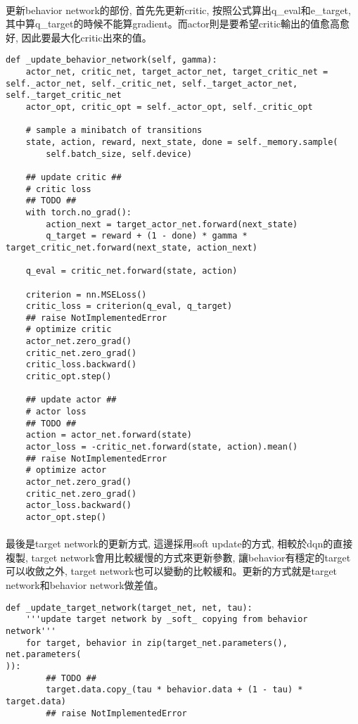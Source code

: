 \paragraph{}
更新behavior network的部份, 首先先更新critic, 按照公式算出q\_eval和e\_target, 其中算q\_target的時候不能算gradient。而actor則是要希望critic輸出的值愈高愈好, 因此要最大化critic出來的值。
\begin{lstlisting}
def _update_behavior_network(self, gamma):
    actor_net, critic_net, target_actor_net, target_critic_net = self._actor_net, self._critic_net, self._target_actor_net, self._target_critic_net
    actor_opt, critic_opt = self._actor_opt, self._critic_opt

    # sample a minibatch of transitions
    state, action, reward, next_state, done = self._memory.sample(
        self.batch_size, self.device)

    ## update critic ##
    # critic loss
    ## TODO ##
    with torch.no_grad():
        action_next = target_actor_net.forward(next_state)
        q_target = reward + (1 - done) * gamma * target_critic_net.forward(next_state, action_next)

    q_eval = critic_net.forward(state, action)

    criterion = nn.MSELoss()
    critic_loss = criterion(q_eval, q_target)
    ## raise NotImplementedError
    # optimize critic
    actor_net.zero_grad()
    critic_net.zero_grad()
    critic_loss.backward()
    critic_opt.step()

    ## update actor ##
    # actor loss
    ## TODO ##
    action = actor_net.forward(state)
    actor_loss = -critic_net.forward(state, action).mean()
    ## raise NotImplementedError
    # optimize actor
    actor_net.zero_grad()
    critic_net.zero_grad()
    actor_loss.backward()
    actor_opt.step()
\end{lstlisting}
\paragraph{}
最後是target network的更新方式, 這邊採用soft update的方式, 相較於dqn的直接複製, target network會用比較緩慢的方式來更新參數, 讓behavior有穩定的target可以收斂之外, target network也可以變動的比較緩和。更新的方式就是target network和behavior network做差值。
\begin{lstlisting}
def _update_target_network(target_net, net, tau):
    '''update target network by _soft_ copying from behavior network'''
    for target, behavior in zip(target_net.parameters(), net.parameters(
)):
        ## TODO ##
        target.data.copy_(tau * behavior.data + (1 - tau) * target.data)
        ## raise NotImplementedError
\end{lstlisting}
